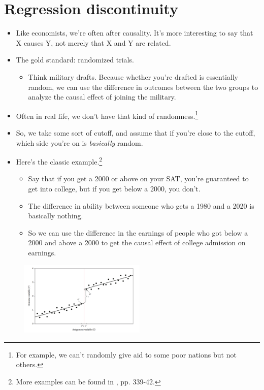 \documentclass{beamer}
\begin{document}
\section{Regression discontinuity}

\begin{frame}
	\begin{itemize}
	\item Like economists, we're often after causality. It's more interesting to say that X causes Y, not merely that X and Y are related.
	\item The gold standard: randomized trials. 
		\begin{itemize}
			\item Think military drafts. Because whether you're drafted is essentially random, we can use the difference in outcomes between the two groups to analyze the causal effect of joining the military.
		\end{itemize}
	\item Often in real life, we don't have that kind of randomness.\footnote{For example, we can't randomly give aid to some poor nations but not others.}
	\item So, we take some sort of cutoff, and assume that if you're close to the cutoff, which side you're on is \textit{basically} random.
	\end{itemize}
\end{frame}

\begin{frame}
	\begin{itemize}
		\item Here's the classic example.\footnote{More examples can be found in \cite{lee2010regression}, pp. 339-42.}
		\begin{itemize}
			\item Say that if you get a 2000 or above on your SAT, you're guaranteed to get into college, but if you get below a 2000, you don't.
			\item The difference in ability between someone who gets a 1980 and a 2020 is basically nothing.
			\item So we can use the difference in the earnings of people who got below a 2000 and above a 2000 to get the causal effect of college admission on earnings.
		\end{itemize}
	\end{itemize}
	\begin{figure}
		\includegraphics[width=6cm]{lee-rd.png}
		\centering
	\end{figure}
\end{frame}
\end{document}
